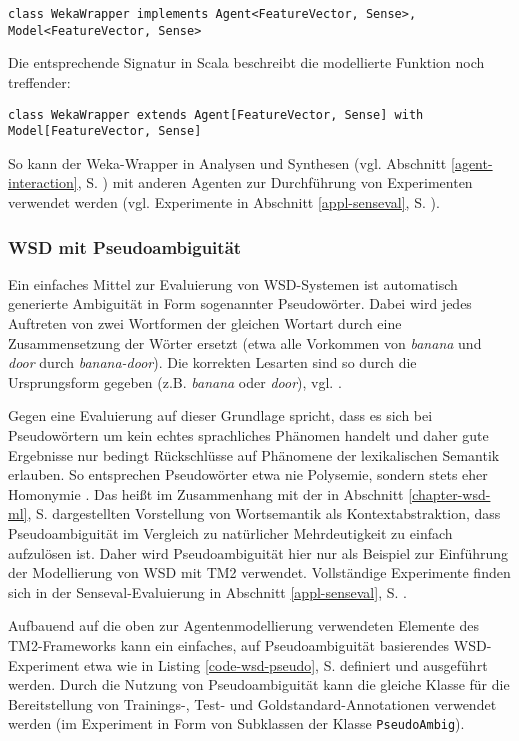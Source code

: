 \documentclass[abstracton, 12pt]{scrartcl}
\begin{document}
\begin{lstlisting}
class WekaWrapper implements Agent<FeatureVector, Sense>, Model<FeatureVector, Sense>
\end{lstlisting}

Die entsprechende Signatur in Scala beschreibt die modellierte Funktion noch treffender:

\begin{lstlisting}
class WekaWrapper extends Agent[FeatureVector, Sense] with Model[FeatureVector, Sense]
\end{lstlisting}

So kann der Weka-Wrapper in Analysen und Synthesen (vgl. Abschnitt \ref{agent-interaction}, S. \pageref{agent-interaction}) mit anderen Agenten zur Durchführung von Experimenten verwendet werden (vgl. Experimente in Abschnitt \ref{appl-senseval}, S. \pageref{appl-senseval}).

\subsubsection{WSD mit Pseudoambiguität} \label{appl-pseudoeval}

Ein einfaches Mittel zur Evaluierung von WSD-Systemen ist automatisch generierte Ambiguität in Form sogenannter Pseudowörter. Dabei wird jedes Auftreten von zwei Wortformen der gleichen Wortart durch eine Zusammensetzung der Wörter ersetzt (etwa alle Vorkommen von \emph{banana} und \emph{door} durch \emph{banana-door}). Die korrekten Lesarten sind so durch die Ursprungsform gegeben (z.B. \emph{banana} oder \emph{door}), vgl. \citealt[233]{ManningAndSchuetze1999}.

Gegen eine Evaluierung auf dieser Grundlage spricht, dass es sich bei Pseudowörtern um kein echtes sprachliches Phänomen handelt und daher gute Ergebnisse nur bedingt Rückschlüsse auf Phänomene der lexikalischen Semantik erlauben. So entsprechen Pseudowörter etwa nie Polysemie, sondern stets eher Homonymie \citep[86]{PalmerEtAl2006}. Das heißt im Zusammenhang mit der in Abschnitt \ref{chapter-wsd-ml}, S. \pageref{chapter-wsd-ml} dargestellten Vorstellung von Wortsemantik als Kontextabstraktion, dass Pseudoambiguität im Vergleich zu natürlicher Mehrdeutigkeit zu einfach aufzulösen ist. Daher wird Pseudoambiguität hier nur als Beispiel zur Einführung der Modellierung von WSD mit TM2 verwendet. Vollständige Experimente finden sich in der Senseval-Evaluierung in Abschnitt \ref{appl-senseval}, S. \pageref{appl-senseval}.

Aufbauend auf die oben zur Agentenmodellierung verwendeten Elemente des TM2-Frame\-works kann ein einfaches, auf Pseudoambiguität basierendes WSD-Experiment etwa wie in Listing \ref{code-wsd-pseudo}, S. \pageref{code-wsd-pseudo} definiert und ausgeführt werden. Durch die Nutzung von Pseudoambiguität kann die gleiche Klasse für die Bereitstellung von Trainings-, Test- und Goldstandard-Annotationen verwendet werden (im Experiment in Form von Subklassen der Klasse \lstinline!PseudoAmbig!).
\end{document}
